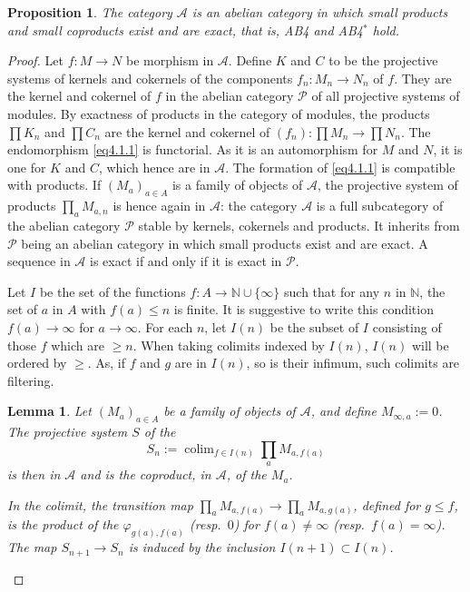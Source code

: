 \documentclass[11pt,a4paper]{article}
\theoremstyle{plain}
\newtheorem{lemma}[theorem]{Lemma}
\newtheorem{proposition}[theorem]{Proposition}
\theoremstyle{definition}
\DeclareMathOperator{\colim}{colim}
\numberwithin{equation}{section}
\begin{document}
\begin{proposition}\label{prop4.2}
The category $\mathcal{A}$ is an abelian category in which small products and small coproducts exist and are exact, that is, AB4 and AB4$^{*}$ hold.
\end{proposition}

\begin{proof}
Let $f: M \to N$ be morphism in $\mathcal{A}$. Define $K$ and $C$ to be the projective systems of kernels and cokernels of the components $f_{n}: M_{n} \to N_{n}$ of $f$. They are the kernel and cokernel of $f$ in the abelian category $\mathcal{P}$ of all projective systems of modules. By exactness of products in the category of modules, the products $\prod K_{n}$ and $\prod C_{n}$ are the kernel and cokernel of $(f_{n}): \prod M_{n} \to \prod N_{n}$. The endomorphism \eqref{eq4.1.1} is functorial. As it is an automorphism for $M$ and $N$, it is one for $K$ and $C$, which hence are in $\mathcal{A}$. The formation of \eqref{eq4.1.1} is compatible with products. If $(M_{a})_{a\in A}$ is a family of objects of $\mathcal{A}$, the projective system of products $\prod_{a} M_{a,n}$ is hence again in $\mathcal{A}$: the category $\mathcal{A}$ is a full subcategory of the abelian category $\mathcal{P}$ stable by kernels, cokernels and products. It inherits from $\mathcal{P}$ being an abelian category in which small products exist and are exact. A sequence in $\mathcal{A}$ is exact if and only if it is exact in $\mathcal{P}$.

Let $I$ be the set of the functions $f: A \to \mathbb{N} \cup \{\infty\}$ such that for any $n$ in $\mathbb{N}$, the set of $a$ in $A$ with $f(a) \leq n$ is finite. It is suggestive to write this condition $f(a) \to \infty$ for $a \to \infty$. For each $n$, let $I(n)$ be the subset of $I$ consisting of those $f$ which are $\geq n$. When taking colimits indexed by $I(n)$, $I(n)$ will be ordered by $\geq$. As, if $f$ and $g$ are in $I(n)$, so is their infimum, such colimits are filtering.

\begin{lemma}\label{lem4.3}
Let $(M_{a})_{a\in A}$ be a family of objects of $\mathcal{A}$, and define $M_{\infty,a} := 0$. The projective system $S$ of the
\begin{equation*}
S_{n} := \colim_{f\in I(n)} \prod_{a} M_{a,f(a)}
\end{equation*}
is then in $\mathcal{A}$ and is the coproduct, in $\mathcal{A}$, of the $M_{a}$.

In the colimit, the transition map $\prod_{a} M_{a,f(a)} \to \prod_{a} M_{a,g(a)}$, defined for $g \leq f$, is the product of the $\varphi_{g(a),f(a)}$ (resp.~$0$) for $f(a) \neq \infty$ (resp.~$f(a) = \infty$). The map $S_{n+1} \to S_{n}$ is induced by the inclusion $I(n+1) \subset I(n)$.
\end{lemma}


\end{proof}
\end{document}
